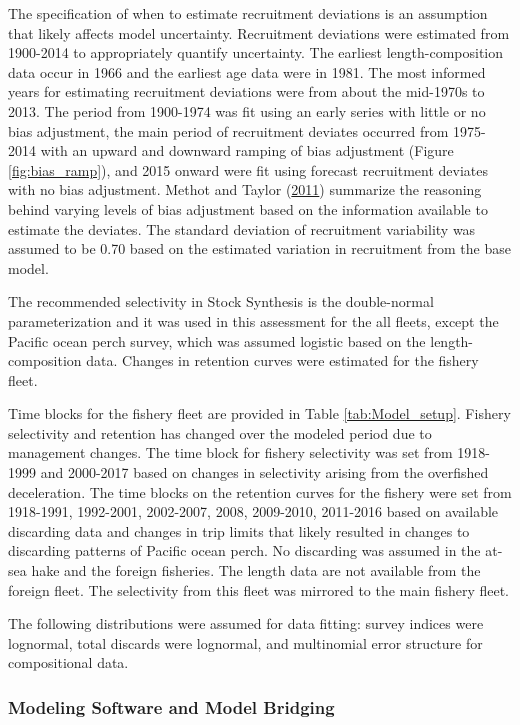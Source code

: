 \documentclass[12pt,]{article}
\begin{document}
The specification of when to estimate recruitment deviations is an
assumption that likely affects model uncertainty. Recruitment deviations
were estimated from 1900-2014 to appropriately quantify uncertainty. The
earliest length-composition data occur in 1966 and the earliest age data
were in 1981. The most informed years for estimating recruitment
deviations were from about the mid-1970s to 2013. The period from
1900-1974 was fit using an early series with little or no bias
adjustment, the main period of recruitment deviates occurred from
1975-2014 with an upward and downward ramping of bias adjustment (Figure
\ref{fig:bias_ramp}), and 2015 onward were fit using forecast
recruitment deviates with no bias adjustment. Methot and Taylor
(\protect\hyperlink{ref-methot_adjusting_2011}{2011}) summarize the
reasoning behind varying levels of bias adjustment based on the
information available to estimate the deviates. The standard deviation
of recruitment variability was assumed to be 0.70 based on the estimated
variation in recruitment from the base model.

The recommended selectivity in Stock Synthesis is the double-normal
parameterization and it was used in this assessment for the all fleets,
except the Pacific ocean perch survey, which was assumed logistic based
on the length-composition data. Changes in retention curves were
estimated for the fishery fleet.

Time blocks for the fishery fleet are provided in Table
\ref{tab:Model_setup}. Fishery selectivity and retention has changed
over the modeled period due to management changes. The time block for
fishery selectivity was set from 1918-1999 and 2000-2017 based on
changes in selectivity arising from the overfished deceleration. The
time blocks on the retention curves for the fishery were set from
1918-1991, 1992-2001, 2002-2007, 2008, 2009-2010, 2011-2016 based on
available discarding data and changes in trip limits that likely
resulted in changes to discarding patterns of Pacific ocean perch. No
discarding was assumed in the at-sea hake and the foreign fisheries. The
length data are not available from the foreign fleet. The selectivity
from this fleet was mirrored to the main fishery fleet.

The following distributions were assumed for data fitting: survey
indices were lognormal, total discards were lognormal, and multinomial
error structure for compositional data.

\subsubsection{Modeling Software and Model
Bridging}\label{modeling-software-and-model-bridging}
\end{document}
